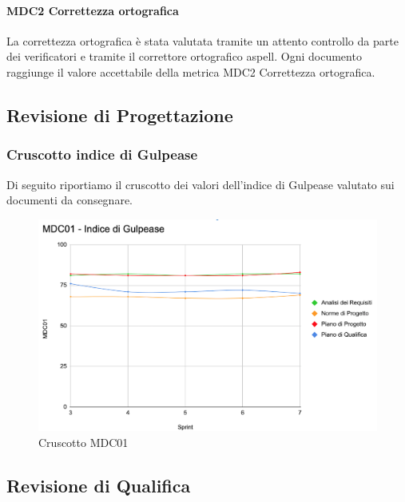 \paragraph{MDC2 Correttezza ortografica}

La correttezza ortografica è stata valutata tramite un attento controllo da parte dei verificatori e tramite il correttore ortografico aspell.  Ogni documento raggiunge il valore accettabile della metrica MDC2 Correttezza ortografica. 
\newpage{}
\subsection{Revisione di Progettazione}
\subsubsection{Cruscotto indice di Gulpease}

Di seguito riportiamo il cruscotto dei valori dell'indice di Gulpease valutato sui documenti da consegnare.

\begin{figure}[H]
    \centering
    \includegraphics[scale = 0.55]{immagini/cruscottoRP.png}
    \caption{Cruscotto MDC01}
    \label{fig:Rappresentazione del modello agile}
\end{figure}

\newpage

\subsection{Revisione di Qualifica}
